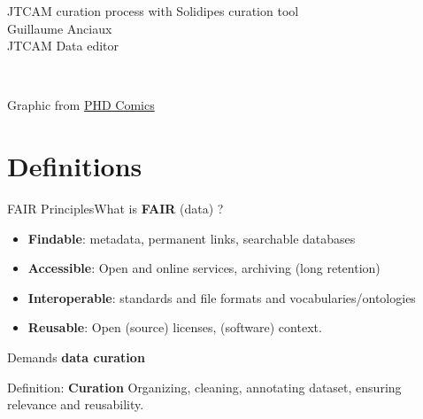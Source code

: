 \documentclass[10pt,compress,serif,aspectratio=169]{beamer}
\begin{document}
\begin{frame}[t]
	\begin{center}
		\vspace{.6cm}
		{\large JTCAM curation process with Solidipes curation tool}\\
		\vspace{.5cm}
		{\Large Guillaume Anciaux}\\{JTCAM Data editor}\\
	\end{center}
	\vspace{.5cm}
	 \\ \vspace{.2cm}

	\vspace{.5cm}
	\begin{center}
		\small
		Graphic from \href{http://www.phdcomics.com/comics.php?f=1533}{PHD Comics}
	\end{center}
\end{frame}




\section{Definitions}

\begin{frame}{FAIR Principles}{What is {\Large \textbf{FAIR}} (data) ?}

	\begin{itemize}
		\item \textbf{Findable}: metadata, permanent links, searchable databases
		\item \textbf{Accessible}: Open and online services, archiving (long retention)
		\item \textbf{Interoperable}: standards and file formats and vocabularies/ontologies
		\item \textbf{Reusable}: Open (source) licenses, (software) context.
	\end{itemize}

	\pause
	\vfill
	\begin{center}
		{\huge \color{red} Demands \textbf{data curation}}
	\end{center}

	\pause
	\vfill
	\begin{block}{  Definition: \textbf{\large Curation}}
		Organizing, cleaning, annotating dataset, ensuring relevance and reusability.\\
	\end{block}
\end{frame}
\end{document}
